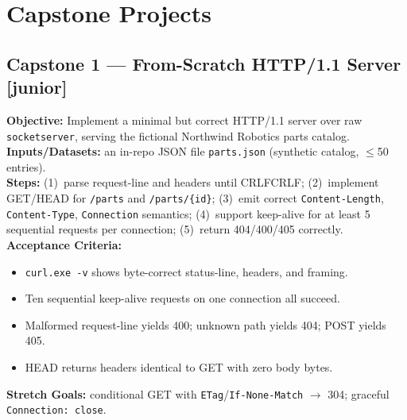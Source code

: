 \section{Capstone Projects}

\subsection{Capstone 1 --- From-Scratch HTTP/1.1 Server [junior]}
\textbf{Objective:} Implement a minimal but correct HTTP/1.1 server over raw \texttt{socketserver}, serving the fictional Northwind Robotics parts catalog.\\
\textbf{Inputs/Datasets:} an in-repo JSON file \texttt{parts.json} (synthetic catalog, $\leq$50 entries).\\
\textbf{Steps:} (1)~parse request-line and headers until CRLFCRLF; (2)~implement GET/HEAD for \texttt{/parts} and \texttt{/parts/\{id\}}; (3)~emit correct \texttt{Content-Length}, \texttt{Content-Type}, \texttt{Connection} semantics; (4)~support keep-alive for at least 5 sequential requests per connection; (5)~return 404/400/405 correctly.\\
\textbf{Acceptance Criteria:}
\begin{itemize}
  \item[$\square$] \texttt{curl.exe -v} shows byte-correct status-line, headers, and framing.
  \item[$\square$] Ten sequential keep-alive requests on one connection all succeed.
  \item[$\square$] Malformed request-line yields 400; unknown path yields 404; POST yields 405.
  \item[$\square$] HEAD returns headers identical to GET with zero body bytes.
\end{itemize}
\textbf{Stretch Goals:} conditional GET with \texttt{ETag}/\texttt{If-None-Match} $\to$ 304; graceful \texttt{Connection: close}.

